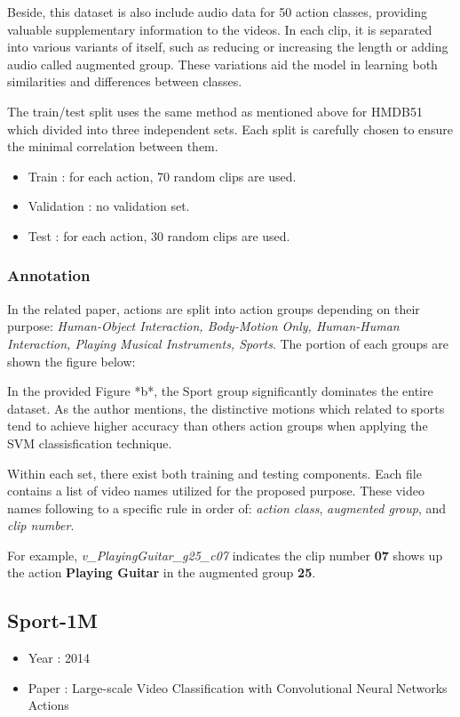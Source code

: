 \documentclass[10pt,onecolumn,letterpaper]{article}
\begin{document}
Beside, this dataset is also include audio data for 50 action classes, providing valuable supplementary information to the videos. In each clip, it is separated into various variants of itself, such as reducing or increasing the length or adding audio called augmented group. These variations aid the model in learning both similarities and differences between classes.

The train/test split uses the same method as mentioned above for HMDB51 which divided into three independent sets. Each split is carefully chosen to ensure the minimal correlation between them.
\begin{itemize}
	\item Train : for each action, 70 random clips are used.
	\item Validation : no validation set.
	\item Test : for each action, 30 random clips are used. 
\end{itemize} 

\subsubsection{Annotation}
In the related paper, actions are split into action groups depending on their purpose: \textit{Human-Object Interaction, Body-Motion Only, Human-Human Interaction, Playing Musical Instruments, Sports}. The portion of each groups are shown the figure below:

In the provided Figure *b*, the Sport group significantly dominates the entire dataset. As the author mentions, the distinctive motions which related to sports tend to achieve higher accuracy than others action groups when applying the SVM classisfication technique.

Within each set, there exist both training and testing components. Each file contains a list of video names utilized for the proposed purpose. These video names following to a specific rule in order of: \textit{action class}, \textit{augmented group}, and \textit{clip number}. 

For example, \textit{v\_PlayingGuitar\_g25\_c07} indicates the clip number \textbf{07} shows up the action \textbf{Playing Guitar} in the augmented group \textbf{25}.
\subsection{Sport-1M}

\begin{itemize}
	\item Year : 2014
	\item Paper : Large-scale Video Classification with Convolutional Neural Networks
	Actions \cite{Sports1M}
\end{itemize}
\end{document}

